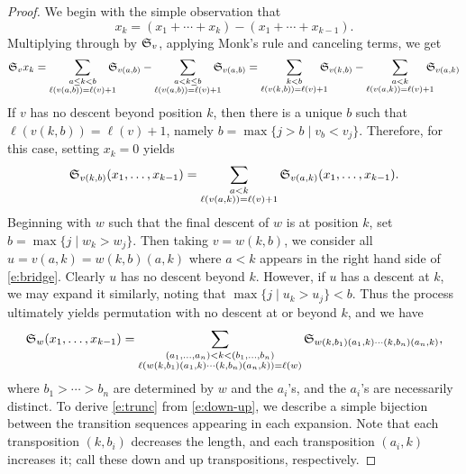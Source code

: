 \documentclass[11pt]{amsart}
\theoremstyle{definition}
\theoremstyle{remark}
\numberwithin{equation}{section}
\newcommand{\schubert}{\ensuremath\mathfrak{S}}
\begin{document}
\begin{proof}
  We begin with the simple observation that
  \[ x_k = (x_1 + \cdots + x_k) - (x_1 + \cdots + x_{k-1}). \]
  Multiplying through by $\schubert_v$, applying Monk's rule and canceling terms, we get
  \begin{displaymath}
    \schubert_{v} x_k = \sum_{\substack{a \leq k < b \\ \ell(v (a,b)) = \ell(v) + 1}} \hspace{-2ex} \schubert_{v (a,b)} 
    - \sum_{\substack{a < k \leq b \\ \ell(v (a,b)) = \ell(v) + 1}} \hspace{-2ex} \schubert_{v (a,b)} 
    = \sum_{\substack{k < b \\ \ell(v (k,b)) = \ell(v) + 1}} \hspace{-2ex} \schubert_{v (k,b)} 
    - \sum_{\substack{a < k \\ \ell(v (a,k)) = \ell(v) + 1}} \hspace{-2ex} \schubert_{v (a,k)} 
  \end{displaymath}
  If $v$ has no descent beyond position $k$, then there is a unique $b$ such that $\ell(v (k,b)) = \ell(v)+1$, namely $b = \max\{j>b \mid v_b < v_j\}$. Therefore, for this case, setting $x_k=0$ yields
  \begin{equation}
    \schubert_{v(k,b)}(x_1, \ldots, x_{k-1}) = \sum_{\substack{a < k \\ \ell(v (a,k)) = \ell(v) + 1}} \schubert_{v (a,k)} (x_1, \ldots, x_{k-1}).
    \label{e:bridge}
  \end{equation}
  Beginning with $w$ such that the final descent of $w$ is at position $k$, set $b = \max\{j \mid w_k > w_j\}$. Then taking $v = w(k,b)$, we consider all $u=v (a,k) = w (k,b) (a,k)$ where $a<k$ appears in the right hand side of \eqref{e:bridge}. Clearly $u$ has no descent beyond $k$. However, if $u$ has a descent at $k$, we may expand it similarly, noting that $\max\{j \mid u_k > u_j\} < b$. Thus the process ultimately yields permutation with no descent at or beyond $k$, and we have
  \begin{equation}
    \schubert_w(x_1,\ldots,x_{k-1}) = \sum_{\substack{(a_1,\ldots,a_n) < k < (b_1,\ldots,b_n) \\ \ell(w (k,b_1)(a_1,k) \cdots (k,b_n)(a_n,k) ) = \ell(w)}} \schubert_{w (k,b_1)(a_1,k) \cdots (k,b_n)(a_n,k)},
    \label{e:down-up}
  \end{equation}
  where $b_1>\cdots>b_n$ are determined by $w$ and the $a_i$'s, and the $a_i$'s are necessarily distinct. To derive \eqref{e:trunc} from \eqref{e:down-up}, we describe a simple bijection between the transition sequences appearing in each expansion. Note that each transposition $(k,b_i)$ decreases the length, and each transposition $(a_i,k)$ increases it; call these down and up transpositions, respectively.
  

\end{proof}
\end{document}
